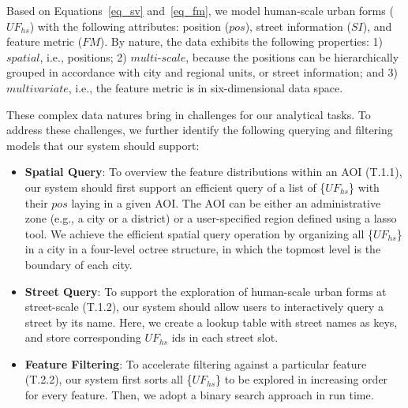 Based on Equations~\ref{eq_sv} and~\ref{eq_fm}, we model human-scale urban forms ($UF_{hs}$) with the following attributes: position ($pos$), street information ($SI$), and feature metric ($FM$).
By nature, the data exhibits the following properties: 
1) $spatial$, i.e., positions;
2) $multi$-$scale$, because the positions can be hierarchically grouped in accordance with city and regional units, or street information;
and 3) $multivariate$, i.e., the feature metric is in six-dimensional data space.

These complex data natures bring in challenges for our analytical tasks.
To address these challenges, we further identify the following querying and filtering models that our system should support:

\vspace*{-2mm}
\begin{itemize}

\item
\textbf{Spatial Query}:
To overview the feature distributions within an AOI (T.1.1), our system should first support an efficient query of a list of \{$UF_{hs}$\} with their $pos$ laying in a given AOI.
The AOI can be either an administrative zone (e.g., a city or a district) or a user-specified region defined using a lasso tool.
We achieve the efficient spatial query operation by organizing all \{$UF_{hs}$\} in a city in a four-level octree structure, in which the topmost level is the boundary of each city.

\vspace*{-2mm}
\item
\textbf{Street Query}:
To support the exploration of human-scale urban forms at street-scale (T.1.2), our system should allow users to interactively query a street by its name.
Here, we create a lookup table with street names as keys, and store corresponding $UF_{hs}$ ids in each street slot.

\vspace*{-2mm}
\item
\textbf{Feature Filtering}:
To accelerate filtering against a particular feature (T.2.2), our system first sorts all \{$UF_{hs}$\} to be explored in increasing order for every feature.
Then, we adopt a binary search approach in run time.

\end{itemize}


